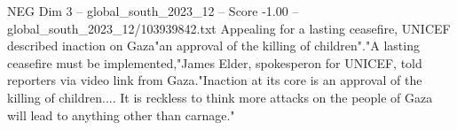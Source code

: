 \begin{textsample}{NEG Dim 3 – global\_south\_2023\_12 – Score -1.00 – global\_south\_2023\_12/103939842.txt}
Appealing for a lasting ceasefire, UNICEF described inaction on Gaza"an approval of the killing of children"."A lasting ceasefire must be implemented,"James Elder, spokesperon for UNICEF, told reporters via video link from Gaza."Inaction at its core is an approval of the killing of children....
It is reckless to think more attacks on the people of Gaza will lead to anything other than carnage."

\end{textsample}
